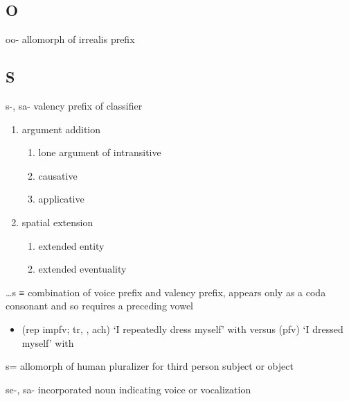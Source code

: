 \documentclass[12pt,letterpaper,oneside,article]{memoir}
\begin{document}
\subsection{O}\label{sec:alphalist-o}
\begin{morphdesc}[resume*=alphalist]
\item[oo-]
	allomorph of  irrealis prefix
\end{morphdesc}

\subsection{S}\label{sec:alphalist-s}
\begin{morphdesc}[resume*=alphalist]
\item[s-, sa-]
	valency prefix of classifier
	\begin{enumerate}
	\item	argument addition
		\begin{enumerate}
		\item	lone argument of intransitive
		\item	causative
		\item	applicative
		\end{enumerate}
	\item	spatial extension
		\begin{enumerate}
		\item	extended entity
		\item	extended eventuality
		\end{enumerate}
	\end{enumerate}

\item[…s]
	≡ 
	combination of  voice prefix
		and  valency prefix,
	appears only as a coda consonant and so requires a preceding vowel
	\begin{itemize}
	\item	{} (rep impfv; tr, , ach) ‘I repeatedly dress myself’
			with \newline
		versus  (pfv) ‘I dressed myself’
			with 
	\end{itemize}

\item[s=]
	allomorph of  human pluralizer for third person subject or object

\item[se-, sa-]
	incorporated noun indicating voice or vocalization


\end{morphdesc}
\end{document}
